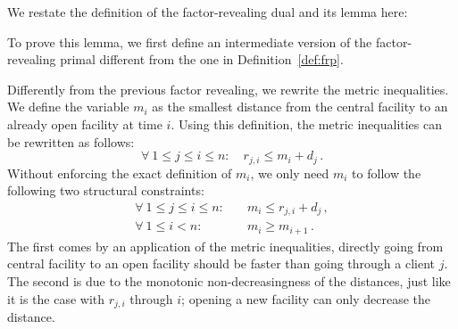 We restate the definition of the factor-revealing dual and its lemma here:


\lemmamathematicalprogram*

To prove this lemma, we first define an intermediate version of the factor-revealing primal different from the one in Definition~\ref{def:frp}.

Differently from the previous factor revealing, we rewrite the metric inequalities. We define the variable $m_i$ as the smallest distance from the central facility to an already open facility at time $i$. 
Using this definition, the metric inequalities can be rewritten as follows:
\begin{equation*}
    \forall \ 1 \le j \le i \le n: \quad r_{j,i} \le m_i + d_j\,.
\end{equation*}
Without enforcing the exact definition of $m_i$, we only need $m_i$ to follow the following two structural constraints:
\begin{align*}
    \forall \ 1 \le j\le i \le n:& \quad m_i \le r_{j,i} + d_j\,, \\
    \forall \ 1 \le i < n:& \quad m_i \ge m_{i+1}\,.
\end{align*}
The first comes by an application of the metric inequalities, directly going from central facility to an open facility should be faster than going through a client $j$. The second is due to the monotonic non-decreasingness of the distances, just like it is the case with $r_{j,i}$ through $i$; opening a new facility can only decrease the distance.

